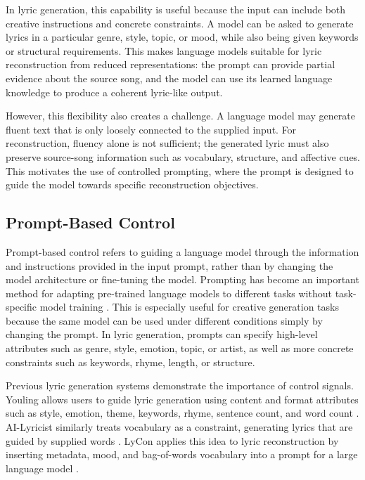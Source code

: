 In lyric generation, this capability is useful because the input can include both creative instructions and concrete constraints. A model can be asked to generate lyrics in a particular genre, style, topic, or mood, while also being given keywords or structural requirements. This makes language models suitable for lyric reconstruction from reduced representations: the prompt can provide partial evidence about the source song, and the model can use its learned language knowledge to produce a coherent lyric-like output.

However, this flexibility also creates a challenge. A language model may generate fluent text that is only loosely connected to the supplied input. For reconstruction, fluency alone is not sufficient; the generated lyric must also preserve source-song information such as vocabulary, structure, and affective cues. This motivates the use of controlled prompting, where the prompt is designed to guide the model towards specific reconstruction objectives.

\subsection{Prompt-Based Control}

Prompt-based control refers to guiding a language model through the information and instructions provided in the input prompt, rather than by changing the model architecture or fine-tuning the model. Prompting has become an important method for adapting pre-trained language models to different tasks without task-specific model training \cite{liu2023pretrain}. This is especially useful for creative generation tasks because the same model can be used under different conditions simply by changing the prompt. In lyric generation, prompts can specify high-level attributes such as genre, style, emotion, topic, or artist, as well as more concrete constraints such as keywords, rhyme, length, or structure.

Previous lyric generation systems demonstrate the importance of control signals. Youling allows users to guide lyric generation using content and format attributes such as style, emotion, theme, keywords, rhyme, sentence count, and word count \cite{zhang2020youling}. AI-Lyricist similarly treats vocabulary as a constraint, generating lyrics that are guided by supplied words \cite{ma2021ailyricist}. LyCon applies this idea to lyric reconstruction by inserting metadata, mood, and bag-of-words vocabulary into a prompt for a large language model \cite{kim2024lycon}.

